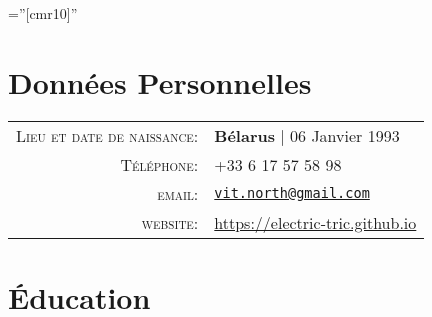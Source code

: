 \documentclass[a4paper,10pt]{article} %
\begin{document}
\pagestyle{empty} %

\font\fb=''[cmr10]'' %

\vfill


\par{\bigskip\par} %

\vfill

\section{Données Personnelles}

\begin{tabular}{rl}
\textsc{Lieu et date de naissance:}     & \textbf{Bélarus}  | 06 Janvier 1993 \\
\textsc{Téléphone:} & +33 6 17 57 58 98 \\
\textsc{email:} &
\href{mailto:vit.north@gmail.com}{\texttt{vit.north@gmail.com}} \\
\textsc{website:} &
\url{https://electric-tric.github.io}
\\

\end{tabular}

\vfill


\section{Éducation}
\end{document}
